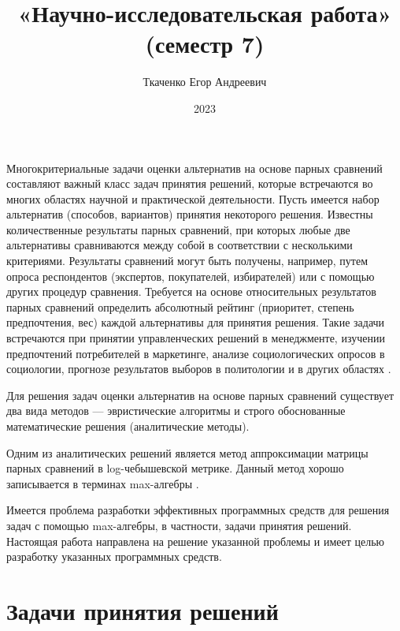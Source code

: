 \documentclass[specialist, substylefile = spbureport.rtx,
    subf,href,colorlinks=true, 12pt]{disser}
\title{«Научно-исследовательская работа» (семестр 7)}
\author{Ткаченко Егор Андреевич}
\date{2023}
\begin{document}
    \maketitle
    \pagebreak
    \tableofcontents
    \pagebreak

    \intro

        Многокритериальные задачи оценки альтернатив на основе парных сравнений составляют важный класс задач принятия решений, которые встречаются во многих областях научной и практической деятельности. Пусть имеется набор альтернатив (способов, вариантов) принятия некоторого решения. Известны количественные результаты парных сравнений, при которых любые две альтернативы сравниваются между собой в соответствии с несколькими критериями. Результаты сравнений могут быть получены, например, путем опроса респондентов (экспертов, покупателей, избирателей) или с помощью других процедур сравнения. Требуется на основе относительных результатов парных сравнений определить абсолютный рейтинг (приоритет, степень предпочтения, вес) каждой альтернативы для принятия решения. Такие задачи встречаются при принятии управленческих решений в менеджменте, изучении предпочтений потребителей в маркетинге, анализе социологических опросов в социологии, прогнозе результатов выборов в политологии и в других областях \cite{Krivulin2020Reshenie}. 

        Для решения задач оценки альтернатив на основе парных сравнений существует два вида методов --- эвристические алгоритмы и строго обоснованные математические решения (аналитические методы).

        Одним из аналитических решений является метод аппроксимации матрицы парных сравнений в log-чебышевской метрике. Данный метод хорошо записывается в терминах max-алгебры \cite{Krivulin2019Metody}.

        Имеется проблема разработки эффективных программных средств для решения задач с помощью max-алгебры, в частности, задачи принятия решений. Настоящая работа направлена на решение указанной проблемы и имеет целью разработку указанных программных средств.


    \chapter{Задачи принятия решений}

\end{document}
